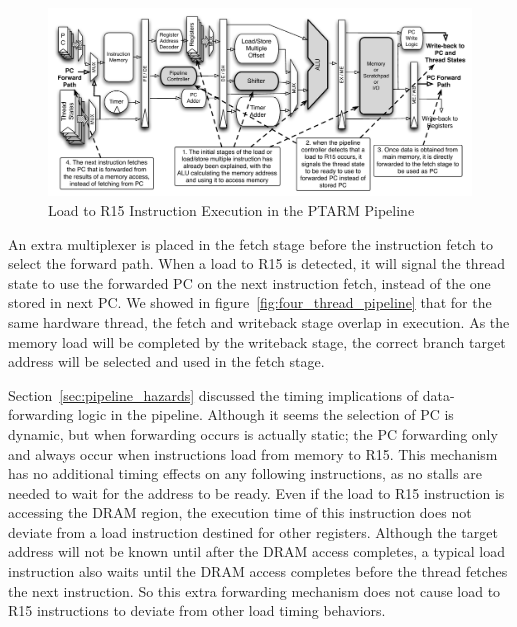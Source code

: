 \begin{figure}[h]
  \vspace{-15pt}
  \begin{center}
    \includegraphics[scale=.54]{figs/ld_to_pc_pipeline_implementation}
  \end{center}
  \vspace{-3mm}
  \caption{Load to R15 Instruction Execution in the PTARM Pipeline}
  \label{fig:ld_to_pc_pipeline_implementation}
\end{figure}

An extra multiplexer is placed in the fetch stage before the instruction fetch to select the forward path.
When a load to R15 is detected, it will signal the thread state to use the forwarded PC on the next instruction fetch, instead of the one stored in next PC.
We showed in figure~\ref{fig:four_thread_pipeline} that for the same hardware thread, the fetch and writeback stage overlap in execution.  
As the memory load will be completed by the writeback stage, the correct branch target address will be selected and used in the fetch stage.

Section~\ref{sec:pipeline_hazards} discussed the timing implications of data-forwarding logic in the pipeline.
Although it seems the selection of PC is dynamic, but when forwarding occurs is actually static; the PC forwarding only and always occur when instructions load from memory to R15.
This mechanism has no additional timing effects on any following instructions, as no stalls are needed to wait for the address to be ready. 
Even if the load to R15 instruction is accessing the DRAM region, the execution time of this instruction does not deviate from a load instruction destined for other registers.
Although the target address will not be known until after the DRAM access completes, a typical load instruction also waits until the DRAM access completes before the thread fetches the next instruction. 
So this extra forwarding mechanism does not cause load to R15 instructions to deviate from other load timing behaviors.

